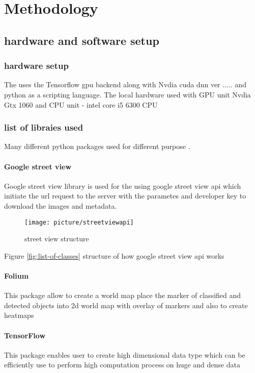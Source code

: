 
\chapter{Methodology}

\section{hardware and software setup}

\subsection{hardware setup}
The uses the Tensorflow gpu backend along with Nvdia cuda dnn ver ..... and python as a scripting language. The local hardware used with GPU unit Nvdia Gtx 1060 and CPU unit - intel core i5 6300 CPU

\subsection{list of libraies used}
Many different python packages used for different purpose .

\subsubsection{Google street view}
Google street view library is used for the using google street view api which initiate the url request to the server with the parametes and developer key to download the images and metadata.

\begin{figure}
	\centering
	\texttt{[image: picture/streetviewapi]}
	\caption{street view structure}
	\label{fig:streetviewapi}
\end{figure}

Figure \ref{fig:list-of-classes} structure of how google street view api works

\subsubsection{Folium}
This package allow to create a world map place the marker of classified and detected objects into 2d world map with overlay of markers and also to create heatmaps 

\subsubsection{TensorFlow}
This package enables user to create high dimensional data type which can be efficiently use to perform high computation process on huge and dense data 

